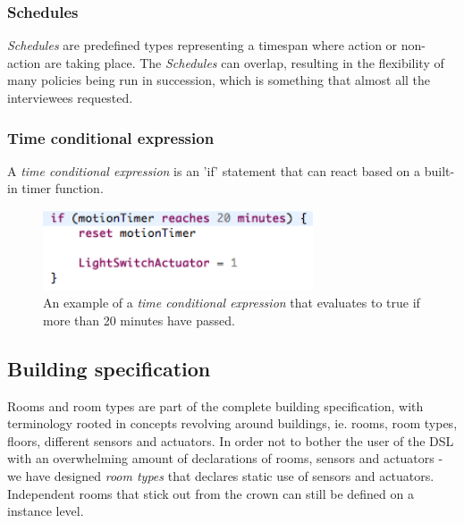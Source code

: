 \documentclass{llncs}
\begin{document}
\subsubsection{Schedules}\label{subsubsec:schedules}
\textit{Schedules} are predefined types representing a timespan where action or non-action are taking place. The \textit{Schedules} can overlap, resulting in the flexibility of many policies being run in succession, which is something that almost all the interviewees requested.

\subsubsection{Time conditional expression}\label{subsubsec:conditionalexpression}
A \textit{time conditional expression} is an 'if' statement that can react based on a built-in timer function. 

\begin{figure}
  \begin{center}
    \includegraphics[width=8cm]{dsl-conditional-time-expression.png}
  \end{center}  
\caption{An example of a \textit{time conditional expression} that evaluates to true if more than 20 minutes have passed.}
\label{fig:schedules}
\end{figure}

\subsection{Building specification}\label{subsec:building-specification}
Rooms and room types are part of the complete building specification, with terminology rooted in concepts revolving around buildings, ie. rooms, room types, floors, different sensors and actuators. In order not to bother the user of the DSL with an overwhelming amount of declarations of rooms, sensors and actuators - we have designed \textit{room types} that declares static use of sensors and actuators. Independent rooms that stick out from the crown can still be defined on a instance level.
\end{document}
